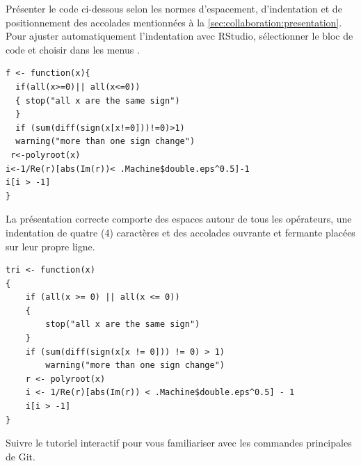 \begin{exercice}
  Présenter le code ci-dessous selon les normes d'espacement,
  d'indentation et de positionnement des accolades mentionnées à la
  \autoref{sec:collaboration:presentation}. Pour ajuster
  automatiquement l'indentation avec RStudio, sélectionner le bloc de
  code et choisir dans les menus .

\begin{Schunk}
\begin{Verbatim}
f <- function(x){
  if(all(x>=0)|| all(x<=0))
  { stop("all x are the same sign")
  }
  if (sum(diff(sign(x[x!=0]))!=0)>1)
  warning("more than one sign change")
 r<-polyroot(x)
i<-1/Re(r)[abs(Im(r))< .Machine$double.eps^0.5]-1
i[i > -1]
}
\end{Verbatim}
\end{Schunk}
\begin{sol}
  La présentation correcte comporte des espaces autour de tous les
  opérateurs, une indentation de quatre (4) caractères et des
  accolades ouvrante et fermante placées sur leur propre ligne.
\begin{Schunk}
\begin{Verbatim}[fontsize=\relsize{-1}]
tri <- function(x)
{
    if (all(x >= 0) || all(x <= 0))
    {
        stop("all x are the same sign")
    }
    if (sum(diff(sign(x[x != 0])) != 0) > 1)
        warning("more than one sign change")
    r <- polyroot(x)
    i <- 1/Re(r)[abs(Im(r)) < .Machine$double.eps^0.5] - 1
    i[i > -1]
}
\end{Verbatim}
\end{Schunk}
\end{sol}
\end{exercice}

\begin{exercice}[nosol]
  Suivre le tutoriel interactif 
  pour vous familiariser avec les commandes principales de Git.
\end{exercice}

